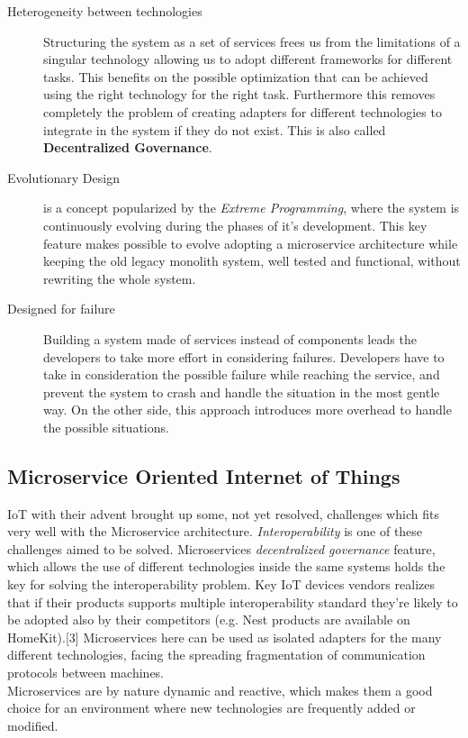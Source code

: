 \begin{itemize}
\begin{description}
  \item[Heterogeneity between technologies] Structuring the system as a set
  of services frees us from the limitations of a singular technology allowing
  us to adopt different frameworks for different tasks. This benefits on the
  possible optimization that can be achieved using the right technology for the
  right task. Furthermore this removes completely the problem of creating adapters
  for different technologies to integrate in the system if they do not exist. This is
  also called \textbf{Decentralized Governance}.
  \item[Evolutionary Design] is a concept popularized by the \textit{Extreme Programming},
  where the system is continuously evolving during the phases of it's development.
  This key feature makes possible to evolve adopting a microservice architecture while
  keeping the old legacy monolith system, well tested and functional, without rewriting
  the whole system.
  \item[Designed for failure] Building a system made of services instead of components
  leads the developers to take more effort in considering failures. Developers have
  to take in consideration the possible failure while reaching the service, and
  prevent the system to crash and handle the situation in the most gentle way. On the
  other side, this approach introduces more overhead to handle the possible situations.


\end{description}


\subsection{Microservice Oriented Internet of Things}
IoT with their advent brought up some, not yet resolved, challenges which fits
very well with the Microservice architecture. \textit{Interoperability} is one of these
challenges aimed to be solved. Microservices \textit{decentralized governance} feature,
which allows the use of different technologies inside the same systems holds the key for
solving the interoperability problem. Key IoT devices vendors realizes that if their products
supports multiple interoperability standard they're likely to be adopted also by their
competitors (e.g. Nest products are available on HomeKit).[3] Microservices here can be
used as isolated adapters for the many different technologies, facing the spreading
fragmentation of communication protocols between machines.\\
Microservices are by nature dynamic and reactive, which makes them a good choice for
an environment where new technologies are frequently added or modified.


\end{itemize}
